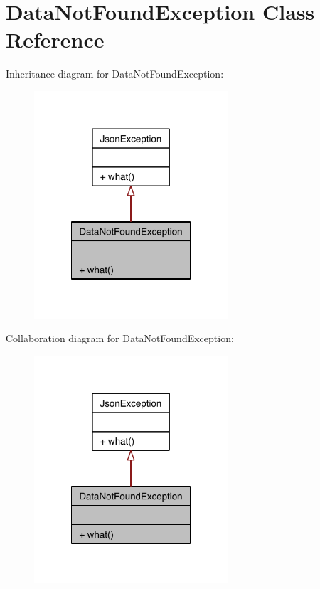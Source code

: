\hypertarget{class_data_not_found_exception}{\section{Data\-Not\-Found\-Exception Class Reference}
\label{class_data_not_found_exception}
}


Inheritance diagram for Data\-Not\-Found\-Exception\-:\nopagebreak
\begin{figure}[H]
\begin{center}
\leavevmode
\includegraphics[width=204pt]{class_data_not_found_exception__inherit__graph}
\end{center}
\end{figure}


Collaboration diagram for Data\-Not\-Found\-Exception\-:\nopagebreak
\begin{figure}[H]
\begin{center}
\leavevmode
\includegraphics[width=204pt]{class_data_not_found_exception__coll__graph}
\end{center}
\end{figure}

